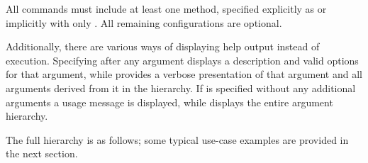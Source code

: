 All commands must include at least one method, specified explicitly as
 or implicitly with only .
All remaining configurations are optional.

Additionally, there are various ways of displaying help output instead
of execution.  Specifying  after any argument displays a 
description and valid options for that argument, while 
provides a verbose presentation of that argument and all arguments
derived from it in the hierarchy.  If  is specified without any
additional arguments a usage message is displayed, while 
displays the entire argument hierarchy.

The full hierarchy is as follows; some typical use-case examples 
are provided in the next section.

